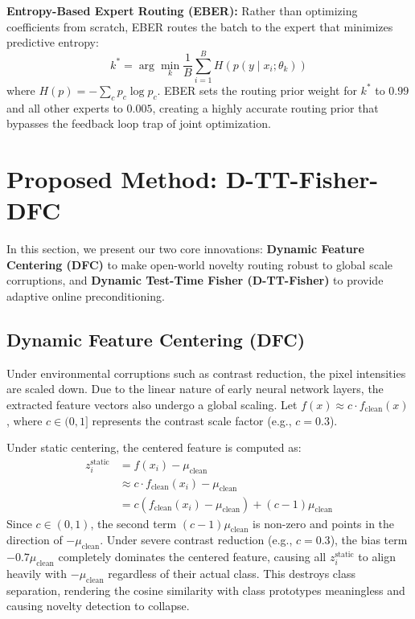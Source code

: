 \documentclass{article}
\theoremstyle{plain}
\theoremstyle{definition}
\theoremstyle{remark}
\begin{document}
\textbf{Entropy-Based Expert Routing (EBER):} Rather than optimizing coefficients from scratch, EBER routes the batch to the expert that minimizes predictive entropy:
\begin{equation}
  k^* = \arg\min_k \frac{1}{B} \sum_{i=1}^B H(p(y \mid x_i; \theta_k))
\end{equation}
where $H(p) = -\sum_c p_c \log p_c$. EBER sets the routing prior weight for $k^*$ to $0.99$ and all other experts to $0.005$, creating a highly accurate routing prior that bypasses the feedback loop trap of joint optimization.

\section{Proposed Method: D-TT-Fisher-DFC}
\label{sec:method}
In this section, we present our two core innovations: \textbf{Dynamic Feature Centering (DFC)} to make open-world novelty routing robust to global scale corruptions, and \textbf{Dynamic Test-Time Fisher (D-TT-Fisher)} to provide adaptive online preconditioning.

\subsection{Dynamic Feature Centering (DFC)}
Under environmental corruptions such as contrast reduction, the pixel intensities are scaled down. Due to the linear nature of early neural network layers, the extracted feature vectors also undergo a global scaling. Let $f(x) \approx c \cdot f_{\text{clean}}(x)$, where $c \in (0, 1]$ represents the contrast scale factor (e.g., $c = 0.3$).

Under static centering, the centered feature is computed as:
\begin{align}
  z_i^{\text{static}} &= f(x_i) - \mu_{\text{clean}} \nonumber \\
  &\approx c \cdot f_{\text{clean}}(x_i) - \mu_{\text{clean}} \nonumber \\
  &= c(f_{\text{clean}}(x_i) - \mu_{\text{clean}}) + (c - 1)\mu_{\text{clean}}
\end{align}
Since $c \in (0, 1)$, the second term $(c - 1)\mu_{\text{clean}}$ is non-zero and points in the direction of $-\mu_{\text{clean}}$. Under severe contrast reduction (e.g., $c = 0.3$), the bias term $-0.7\mu_{\text{clean}}$ completely dominates the centered feature, causing all $z_i^{\text{static}}$ to align heavily with $-\mu_{\text{clean}}$ regardless of their actual class. This destroys class separation, rendering the cosine similarity with class prototypes meaningless and causing novelty detection to collapse.
\end{document}
